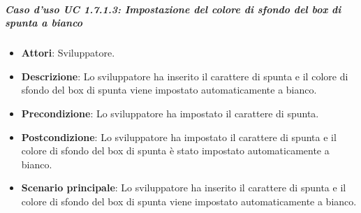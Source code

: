 \subparagraph{Caso d'uso UC 1.7.1.3: Impostazione del colore di sfondo del box di spunta a bianco}

\FloatBarrier
\begin{itemize}
\item\textbf{Attori}: Sviluppatore.
\item\textbf{Descrizione}: Lo sviluppatore ha inserito il carattere di spunta e il colore di sfondo del box di spunta viene impostato automaticamente a bianco.
\item\textbf{Precondizione}: Lo sviluppatore ha impostato il carattere di spunta.
\item\textbf{Postcondizione}: Lo sviluppatore ha impostato il carattere di spunta e il colore di sfondo del box di spunta è stato impostato automaticamente a bianco.
\item\textbf{Scenario principale}: Lo sviluppatore ha inserito il carattere di spunta e il colore di sfondo del box di spunta viene impostato automaticamente a bianco.
\end{itemize}